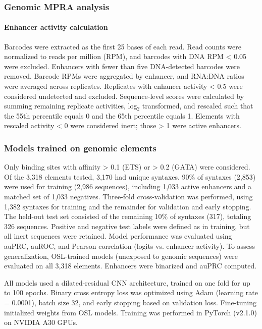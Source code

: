 \subsubsection{Genomic MPRA analysis}

\paragraph{Enhancer activity calculation}

Barcodes were extracted as the first 25 bases of each read. Read counts were normalized to reads per million (RPM), and barcodes with DNA RPM \textless{} 0.05 were excluded. Enhancers with fewer than five DNA-detected barcodes were removed. Barcode RPMs were aggregated by enhancer, and RNA:DNA ratios were averaged across replicates. Replicates with enhancer activity \textless{} 0.5 were considered undetected and excluded. Sequence-level scores were calculated by summing remaining replicate activities, log$_2$ transformed, and rescaled such that the 55th percentile equals 0 and the 65th percentile equals 1. Elements with rescaled activity \textless{} 0 were considered inert; those \textgreater{} 1 were active enhancers.

\subsubsection{Models trained on genomic elements}

Only binding sites with affinity \textgreater{} 0.1 (ETS) or \textgreater{} 0.2 (GATA) were considered. Of the 3,318 elements tested, 3,170 had unique syntaxes. 90\% of syntaxes (2,853) were used for training (2,986 sequences), including 1,033 active enhancers and a matched set of 1,033 negatives. Three-fold cross-validation was performed, using 1,382 syntaxes for training and the remainder for validation and early stopping. The held-out test set consisted of the remaining 10\% of syntaxes (317), totaling 326 sequences. Positive and negative test labels were defined as in training, but all inert sequences were retained. Model performance was evaluated using auPRC, auROC, and Pearson correlation (logits vs. enhancer activity). To assess generalization, OSL-trained models (unexposed to genomic sequences) were evaluated on all 3,318 elements. Enhancers were binarized and auPRC computed.

All models used a dilated-residual CNN architecture, trained on one fold for up to 100 epochs. Binary cross entropy loss was optimized using Adam\cite{Kingma2014-kn} (learning rate = 0.0001), batch size 32, and early stopping based on validation loss. Fine-tuning initialized weights from OSL models. Training was performed in PyTorch (v2.1.0) on NVIDIA A30 GPUs.

